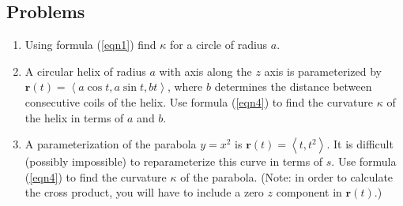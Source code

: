 \documentclass[12pt,letterpaper,fleqn]{article}
\newcommand{\lv}[1]{\ensuremath{\left\langle #1 \right\rangle}}
\renewcommand{\vec}[1]{\ensuremath{\pmb{#1}}}
\begin{document}
\subsection*{Problems}
\begin{enumerate}
  \item Using formula (\ref{eqn1}) find $\kappa$ for a circle of radius $a$.
  \item A circular helix of radius $a$ with axis along the $z$ axis is parameterized by $\vec{r}(t) = \lv{a\cos t, a\sin t, bt}$, where $b$ determines the distance between consecutive coils of the helix. Use formula (\ref{eqn4}) to find the curvature $\kappa$ of the helix in terms of $a$ and $b$.
  \item A parameterization of the parabola $y = x^2$ is $\vec{r}(t) = \lv{t, t^2}$. It is difficult (possibly impossible) to reparameterize this curve in terms of $s$. Use formula (\ref{eqn4}) to find the curvature $\kappa$ of the parabola. (Note: in order to calculate the cross product, you will have to include a zero $z$ component in $\vec{r}(t)$.)
\end{enumerate}
\end{document}
